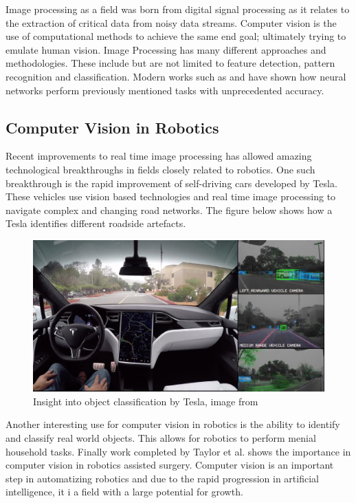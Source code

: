 Image processing as a field was born from digital signal processing as it relates to the extraction of critical data from noisy data streams. Computer vision is the use of computational methods to achieve the same end goal; ultimately trying to emulate human vision. Image Processing has many different approaches and methodologies. These include but are not limited to feature detection, pattern recognition and classification. Modern works such as \cite{chen2016deeplab} and \cite{shi2016real} have shown how neural networks perform previously mentioned tasks with unprecedented accuracy.

\subsection{Computer Vision in Robotics}
Recent improvements to real time image processing has allowed amazing technological breakthroughs in fields closely related to robotics. One such breakthrough is the rapid improvement of self-driving cars developed by Tesla. These vehicles use vision based technologies and real time image processing to navigate complex and changing road networks. The figure below shows how a Tesla identifies different roadside artefacts.

\begin{figure}[!ht] 
\captionsetup{width=0.8\linewidth, font=small}  
\includegraphics[width=0.8\linewidth]{figures/teslaauto.jpg}
\caption{Insight into object classification by Tesla, image from \cite{tesla}}
\label{fig:teslaauto}
\end{figure}

Another interesting use for computer vision in robotics is the ability to identify and classify real world objects. This allows for robotics to perform menial household tasks. Finally work completed by Taylor et al. \cite{taylor2016medical} shows the importance in computer vision in robotics assisted surgery. Computer vision is an important step in automatizing robotics and due to the rapid progression in artificial intelligence, it i a field with a large potential for growth.

